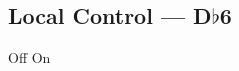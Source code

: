 \subsection[Local Control]{Local Control --- \UiKey{\SET}D$\flat$6}









































Off
On

